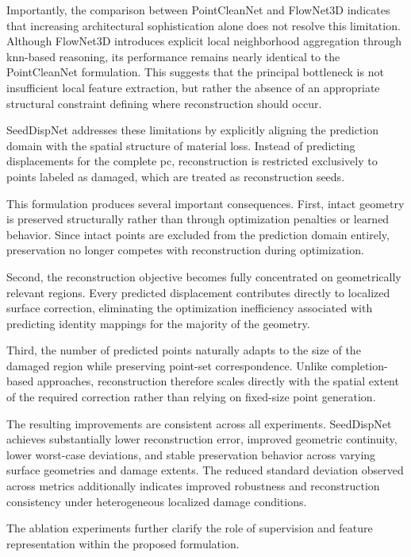 Importantly, the comparison between PointCleanNet and FlowNet3D indicates that increasing architectural sophistication alone does not resolve this limitation. Although FlowNet3D introduces explicit local neighborhood aggregation through \ac{knn}-based reasoning, its performance remains nearly identical to the PointCleanNet formulation. This suggests that the principal bottleneck is not insufficient local feature extraction, but rather the absence of an appropriate structural constraint defining where reconstruction should occur.

SeedDispNet addresses these limitations by explicitly aligning the prediction domain with the spatial structure of material loss. Instead of predicting displacements for the complete \ac{pc}, reconstruction is restricted exclusively to points labeled as damaged, which are treated as reconstruction seeds.

This formulation produces several important consequences. First, intact geometry is preserved structurally rather than through optimization penalties or learned behavior. Since intact points are excluded from the prediction domain entirely, preservation no longer competes with reconstruction during optimization.

Second, the reconstruction objective becomes fully concentrated on geometrically relevant regions. Every predicted displacement contributes directly to localized surface correction, eliminating the optimization inefficiency associated with predicting identity mappings for the majority of the geometry.

Third, the number of predicted points naturally adapts to the size of the damaged region while preserving point-set correspondence. Unlike completion-based approaches, reconstruction therefore scales directly with the spatial extent of the required correction rather than relying on fixed-size point generation.

The resulting improvements are consistent across all experiments. SeedDispNet achieves substantially lower reconstruction error, improved geometric continuity, lower worst-case deviations, and stable preservation behavior across varying surface geometries and damage extents. The reduced standard deviation observed across metrics additionally indicates improved robustness and reconstruction consistency under heterogeneous localized damage conditions.

The ablation experiments further clarify the role of supervision and feature representation within the proposed formulation.

